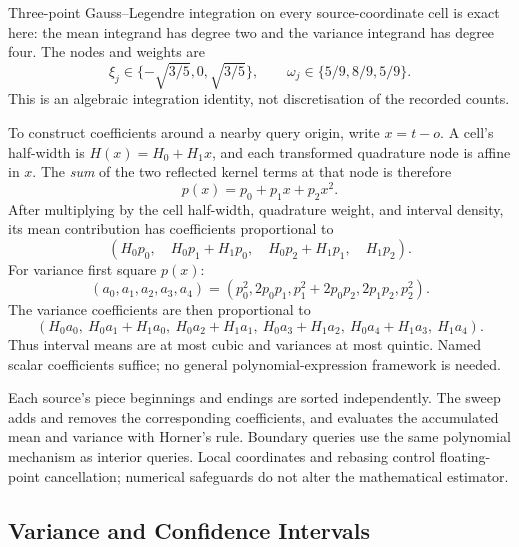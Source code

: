 \documentclass[11pt,a4paper]{article}
\begin{document}
Three-point Gauss--Legendre integration on every source-coordinate cell
is exact here: the mean integrand has degree two and the variance
integrand has degree four.  The nodes and weights are
\begin{equation}
  \xi_j\in\{-\sqrt{3/5},0,\sqrt{3/5}\},
  \qquad \omega_j\in\{5/9,8/9,5/9\}.
\end{equation}
This is an algebraic integration identity, not discretisation of the
recorded counts.

To construct coefficients around a nearby query origin, write $x=t-o$.
A cell's half-width is $H(x)=H_0+H_1x$, and each transformed quadrature
node is affine in $x$.  The \emph{sum} of the two reflected kernel terms at
that node is therefore
\begin{equation}
  p(x)=p_0+p_1x+p_2x^2.
\end{equation}
After multiplying by the cell half-width, quadrature weight, and interval
density, its mean contribution has coefficients proportional to
\begin{equation}
  (H_0p_0,\quad H_0p_1+H_1p_0,\quad
    H_0p_2+H_1p_1,\quad H_1p_2).
\end{equation}
For variance first square $p(x)$:
\begin{equation}
  (a_0,a_1,a_2,a_3,a_4)
  =(p_0^2,2p_0p_1,p_1^2+2p_0p_2,2p_1p_2,p_2^2).
\end{equation}
The variance coefficients are then proportional to
\begin{equation}
 (H_0a_0,\ H_0a_1+H_1a_0,\ H_0a_2+H_1a_1,\
 H_0a_3+H_1a_2,\ H_0a_4+H_1a_3,\ H_1a_4).
\end{equation}
Thus interval means are at most cubic and variances at most quintic.
Named scalar coefficients suffice; no general polynomial-expression
framework is needed.

Each source's piece beginnings and endings are sorted independently.
The sweep adds and removes the corresponding coefficients, and evaluates
the accumulated mean and variance with Horner's rule.  Boundary queries
use the same polynomial mechanism as interior queries.  Local coordinates
and rebasing control floating-point cancellation; numerical safeguards do
not alter the mathematical estimator.

\subsection{Variance and Confidence Intervals}
\end{document}
